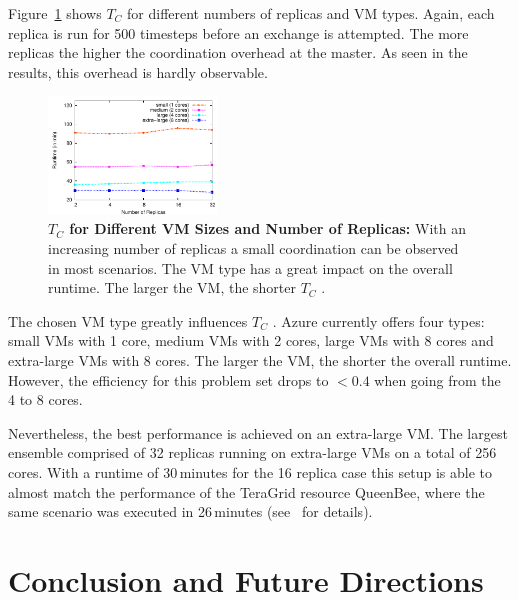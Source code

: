 \documentclass[conference,final]{IEEEtran}
\newcommand{\up}{\vspace*{-1em}}
\newcommand{\tc}{$T_{C}$ }
\begin{document}
Figure~\ref{fig:performance_repex_scaleout_vmsizes} shows \tc
for different numbers of replicas and VM types. 
Again, each replica is run for 500 timesteps before an exchange
is attempted. The more replicas the higher the coordination overhead
at the master. As seen in the results, this overhead is hardly
observable.
\begin{figure}[ht]
    \centering
        \includegraphics[width=0.4\textwidth]{performance/repex-azure.pdf}
    \caption{\textbf{\tc for Different VM Sizes and Number of Replicas:} With
    an increasing number of replicas a small coordination can be observed in most 
    scenarios. The VM type has a great impact on the overall runtime. The larger
    the VM, the shorter \tc. }
    \label{fig:performance_repex_scaleout_vmsizes}
    \up
\end{figure}

The chosen VM type greatly influences \tc. Azure currently offers four
types: small VMs with 1 core, medium VMs with 2 cores, large VMs with 8 cores
and extra-large VMs with 8 cores. The larger the VM, the shorter the overall runtime.
However, the efficiency for this problem set drops to $<0.4$ when going from the 4 to 8 cores. 

Nevertheless, the best performance is achieved on an extra-large
VM. The largest ensemble comprised of 32 replicas running on
extra-large VMs on a total of 256 cores.  With a runtime of
30\,minutes for the 16 replica case this setup is able to almost match
the performance of the TeraGrid resource QueenBee, where the same
scenario was executed in 26\,minutes (see~\cite{repex_ptrs} for
details).

\up
\section{Conclusion and Future Directions}
\up
\end{document}
